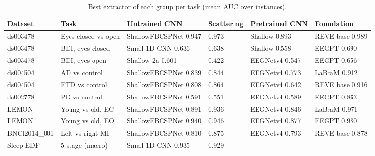 \documentclass[11pt]{article}
\begin{document}
\begin{table}[t]
\centering\footnotesize\setlength{\tabcolsep}{4pt}
\caption{Best extractor of each group per task (mean AUC over instances).}
\label{tab:best}
\begin{tabular}{@{}llllll@{}}
\toprule
Dataset & Task & Untrained CNN & Scattering & Pretrained CNN & Foundation \\
\midrule
ds003478 & Eyes closed vs open & ShallowFBCSPNet 0.947 & 0.973 & Shallow 0.893 & REVE base 0.989 \\
ds003478 & BDI, eyes closed & Small 1D CNN 0.636 & 0.638 & Shallow 0.558 & EEGPT 0.690 \\
ds003478 & BDI, eyes open & Shallow 2a 0.601 & 0.422 & EEGNetv4 0.547 & EEGPT 0.656 \\
ds004504 & AD vs control & ShallowFBCSPNet 0.839 & 0.844 & EEGNetv4 0.773 & LaBraM 0.912 \\
ds004504 & FTD vs control & ShallowFBCSPNet 0.808 & 0.864 & EEGNetv4 0.642 & REVE base 0.916 \\
ds002778 & PD vs control & ShallowFBCSPNet 0.591 & 0.551 & EEGNetv4 0.589 & EEGPT 0.863 \\
LEMON & Young vs old, EC & ShallowFBCSPNet 0.891 & 0.936 & EEGNetv4 0.846 & LaBraM 0.971 \\
LEMON & Young vs old, EO & ShallowFBCSPNet 0.940 & 0.946 & EEGNetv4 0.877 & EEGPT 0.980 \\
BNCI2014\_001 & Left vs right MI & ShallowFBCSPNet 0.810 & 0.875 & EEGNetv4 0.793 & REVE base 0.878 \\
Sleep-EDF & 5-stage (macro) & Small 1D CNN 0.935 & 0.929 & -- & -- \\
\bottomrule
\end{tabular}
\end{table}
\end{document}
